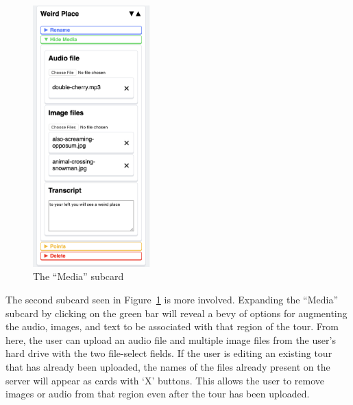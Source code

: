 \documentclass[a4paper, 10pt, american, titlepage]{article}
\begin{document}
\begin{figure}[p]
	\centering
	\includegraphics[width=0.4\textwidth]{media-subcard-editour.png}
	\caption{The ``Media'' subcard}
	\label{fig:mediaSubcard}
\end{figure}

The second subcard seen in Figure~\ref{fig:mediaSubcard} is more involved.
Expanding the ``Media'' subcard by clicking on the green bar will reveal a bevy
of options for augmenting the audio, images, and text to be associated with that
region of the tour. From here, the user can upload an audio file and multiple
image files from the user's hard drive with the two file-select fields. If the
user is editing an existing tour that has already been uploaded, the names of
the files already present on the server will appear as cards with `X' buttons.
This allows the user to remove images or audio from that region even after the
tour has been uploaded.
\end{document}
